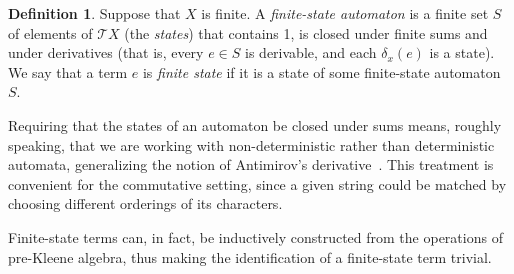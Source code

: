\documentclass[11pt,a4paper]{amsart}
\newif\iffull\fullfalse
\theoremstyle{definition}
\newtheorem{definition}[theorem]{Definition}
\begin{document}
\begin{definition}
  \label{def:finite-state}
  Suppose that $X$ is finite.  A \emph{finite-state automaton} is a finite set
  $S$ of elements of $\mathcal{T}X$ (the \emph{states}) that contains 1, is
  closed under finite sums and under derivatives (that is, every $e \in S$ is
  derivable, and each $ \delta _x(e)$ is a state).  We say that a term $e$ is
  \emph{finite state} if it is a state of some finite-state automaton $S$.
\end{definition}

Requiring that the states of an automaton be closed under sums means, roughly
speaking, that we are working with non-deterministic rather than deterministic
automata, generalizing the notion of Antimirov's derivative~\cite{antimirov_PartialDerivativesRegular_1996}.
This treatment is convenient for the commutative setting, since a given string
could be matched by choosing different orderings of its characters.

\iffull%
However, finite-state automata, as defined in~\Cref{def:finite-state}
can be hard to construct directly. We remedy this difficulty
by defining the notion of \emph{pre-automaton}, which is more flexible,
and then prove that every pre-automaton can be naturally extended to an automaton.

\begin{theoremEnd}{lemma}
  \label{lem:generated-automaton}
  Given a finite commutable set \(X\), a \emph{pre-automaton} is a finite set $S$ of
  terms over $X$ such that every $e  \in  S$ is derivable, and $ \delta _x(e)$ is a sum of
  some elements in $S  \cup  \{1\}$.  The set
  $\bar{S}  \triangleq  \{ \sum _{i = 1}^n e_i  \mid  n  \in  \mathbb{N}, e  \in  (S  \cup  \{1\})^n\}$ is a finite-state
  automaton.  We refer to $\bar{S}$ as the automaton generated by the
  pre-automaton $S$.
\end{theoremEnd}

\begin{proofEnd}
  It is easy to show that $\bar{S}$ is finite, contains 1 and is closed under
  finite sums.  We just need to show that it is closed under taking derivatives.
  This follows from \Cref{lem:derivable-closure}.
\end{proofEnd}
\fi

Finite-state terms can, in fact, be inductively constructed from the operations
of pre-Kleene algebra, thus making the identification of a finite-state term
trivial.
\end{document}

